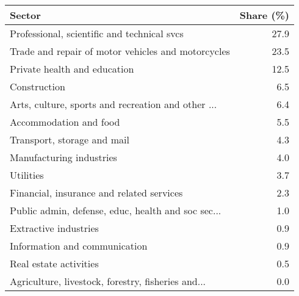 \begin{tabular}{lr}
\toprule
                                            Sector &  Share (\%) \\
\midrule
       Professional, scientific and technical svcs &       27.9 \\
Trade and repair of motor vehicles and motorcycles &       23.5 \\
                      Private health and education &       12.5 \\
                                      Construction &        6.5 \\
Arts, culture, sports and recreation and other ... &        6.4 \\
                            Accommodation and food &        5.5 \\
                       Transport, storage and mail &        4.3 \\
                          Manufacturing industries &        4.0 \\
                                         Utilities &        3.7 \\
         Financial, insurance and related services &        2.3 \\
Public admin, defense, educ, health and soc sec... &        1.0 \\
                             Extractive industries &        0.9 \\
                     Information and communication &        0.9 \\
                            Real estate activities &        0.5 \\
Agriculture, livestock, forestry, fisheries and... &        0.0 \\
\bottomrule
\end{tabular}

